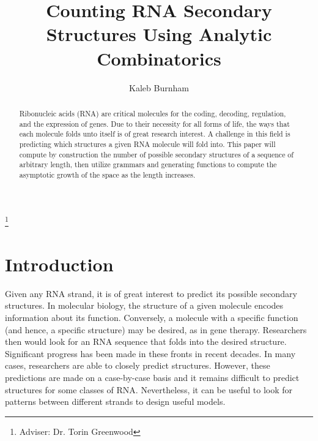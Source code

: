 \documentclass[11pt]{amsart}
\theoremstyle{plain}%
\theoremstyle{definition}
\theoremstyle{remark}
\numberwithin{equation}{thm}
\begin{document}
\title[RNA Secondary Structures]{Counting RNA Secondary Structures Using Analytic Combinatorics}
\thanks{Adviser: Dr. Torin Greenwood}
\author[Burnham]{Kaleb Burnham}

\address{Department of Mathematics 2750\\ North Dakota State University\\PO BOX 6050\\ Fargo, ND 58108-6050\\ USA}


\begin{abstract}
Ribonucleic acids (RNA) are critical molecules for the coding, decoding, regulation, and the expression of genes. Due to their necessity for all forms of life, the ways that each molecule folds unto itself is of great research interest. A challenge in this field is predicting which structures a given RNA molecule will fold into. This paper will compute by construction the number of possible secondary structures of a sequence of arbitrary length, then utilize grammars and generating functions to compute the asymptotic growth of the space as the length increases.
\end{abstract}

\maketitle

\section{Introduction}
Given any RNA strand, it is of great interest to predict its possible secondary structures. In molecular biology, the structure of a given molecule encodes information about its function. Conversely, a molecule with a specific function (and hence, a specific structure) may be desired, as in gene therapy. Researchers then would look for an RNA sequence that folds into the desired structure. Significant progress has been made in these fronts in recent decades. In many cases, researchers are able to closely predict structures. However, these predictions are made on a case-by-case basis
and it remains difficult to predict structures for some classes of RNA. Nevertheless, it can be useful to look for patterns between different strands to design useful models.
\end{document}
